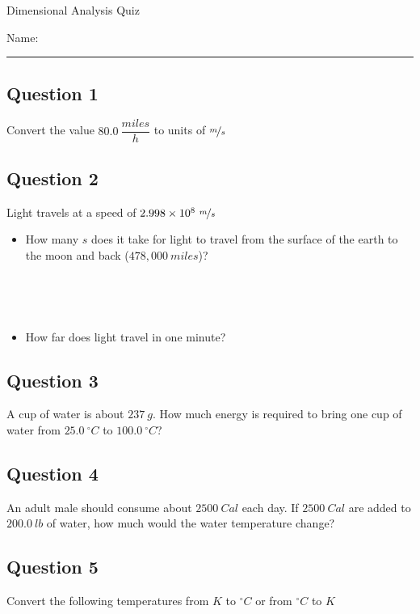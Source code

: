 \documentclass[12pt, letterpaper]{memoir}
\begin{document}
\begin{center}
	{\large	Dimensional Analysis Quiz}
\end{center}
{\large Name: \rule[-1mm]{4in}{.1pt}
\subsection*{Question 1}
Convert the value $80.0~\dfrac{miles}{h}$ to units of $\nicefrac{m}{s}$

\vspace{3em}
\subsection*{Question 2}
Light travels at a speed of $2.998\times10^8~\nicefrac{m}{s}$
\begin{itemize}
	\item How many $s$ does it take for light to travel from the surface of the earth to the moon and back ($478,000~miles$)?

	      ~

	      ~

	\item How far does light travel in one minute?
\end{itemize}

\subsection*{Question 3}
A cup of water is about $237~g$. How much energy is required to bring one cup of water from $25.0~^\circ C$ to $100.0~^\circ C$?

\vspace{3em}
\subsection*{Question 4}
An adult male should consume about $2500~Cal$ each day. If $2500~Cal$ are added to $200.0~lb$ of water, how much would the water temperature change?

\vspace{3em}
\subsection*{Question 5}
Convert the following temperatures from $K$ to $^\circ C$ or from $^\circ C$ to $K$


}
\end{document}
